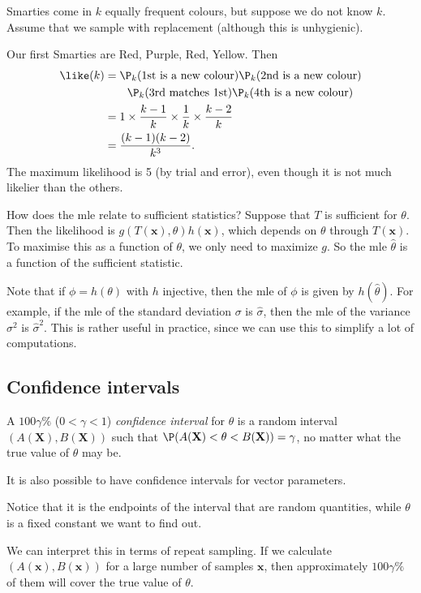 \documentclass[a4paper]{article}
\begin{document}
\begin{eg}
  Smarties come in $k$ equally frequent colours, but suppose we do not know $k$. Assume that we sample with replacement (although this is unhygienic).

  Our first Smarties are Red, Purple, Red, Yellow. Then
  \begin{align*}
  \like(k)&=\P_k(\text{1st is a new colour})\P_k(\text{2nd is a new colour})\\\
  & \quad\quad\P_k(\text{3rd matches 1st})\P_k(\text{4th is a new colour})\\
  &= 1\times \frac{k - 1}{k}\times \frac{1}{k}\times \frac{k - 2}{k}\\
  &= \frac{(k - 1)(k - 2)}{k^3}.
\end{align*}
The maximum likelihood is 5 (by trial and error), even though it is not much likelier than the others.
\end{eg}

How does the mle relate to sufficient statistics? Suppose that $T$ is sufficient for $\theta$. Then the likelihood is $g(T(\mathbf{x}), \theta)h(\mathbf{x})$, which depends on $\theta$ through $T(\mathbf{x})$. To maximise this as a function of $\theta$, we only need to maximize $g$. So the mle $\hat{\theta}$ is a function of the sufficient statistic.

Note that if $\phi = h(\theta)$ with $h$ injective, then the mle of $\phi$ is given by $h(\hat{\theta})$. For example, if the mle of the standard deviation $\sigma$ is $\hat{\sigma}$, then the mle of the variance $\sigma^2$ is $\hat{\sigma}^2$. This is rather useful in practice, since we can use this to simplify a lot of computations.

\subsection{Confidence intervals}
\begin{defi}
  A $100\gamma\%$ ($0 < \gamma < 1$) \emph{confidence interval} for $\theta$ is a random interval $(A(\mathbf{X}), B(\mathbf{X}))$ such that $\P(A(\mathbf{X}) < \theta < B(\mathbf{X})) = \gamma$, no matter what the true value of $\theta$ may be.
\end{defi}
It is also possible to have confidence intervals for vector parameters.

Notice that it is the endpoints of the interval that are random quantities, while $\theta$ is a fixed constant we want to find out.

We can interpret this in terms of repeat sampling. If we calculate $(A(\mathbf{x}), B(\mathbf{x}))$ for a large number of samples $\mathbf{x}$, then approximately $100\gamma\%$ of them will cover the true value of $\theta$.
\end{document}
